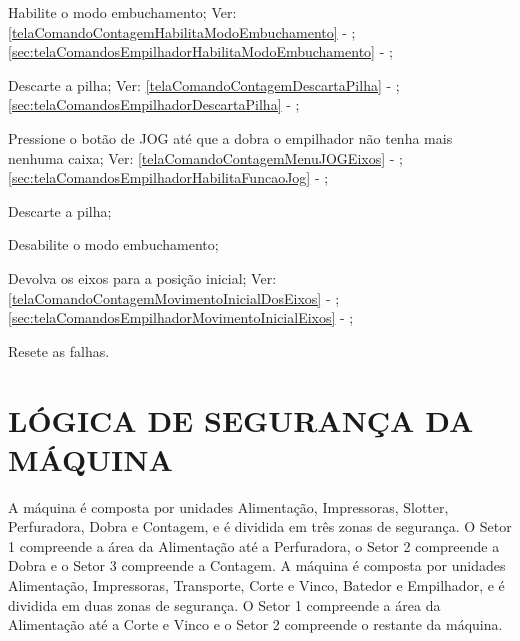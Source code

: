 \begin{procedureFixingIsuesSector3}

  \item[\ding{\dingNumber}] Habilite o modo embuchamento; Ver:
  \ifmachineTypeFlexo
  \ref{telaComandoContagemHabilitaModoEmbuchamento} - ;
  \fi
  \ifmachineTypeIcv
  \ref{sec:telaComandosEmpilhadorHabilitaModoEmbuchamento} - ;
  \fi
  \item[\ding{\dingNumber}] Descarte a pilha; Ver:
  \ifmachineTypeFlexo
  \ref{telaComandoContagemDescartaPilha} - ;
  \fi
  \ifmachineTypeIcv
  \ref{sec:telaComandosEmpilhadorDescartaPilha} - ;
  \fi
  \item[\ding{\dingNumber}] Pressione o botão de JOG até que \ifmachineTypeFlexo a dobra \fi \ifmachineTypeIcv o empilhador \fi não tenha mais nenhuma caixa; Ver:
  \ifmachineTypeFlexo
  \ref{telaComandoContagemMenuJOGEixos} - ;
  \fi
  \ifmachineTypeIcv
  \ref{sec:telaComandosEmpilhadorHabilitaFuncaoJog} - ;
  \fi
  \item[\ding{\dingNumber}] Descarte a pilha;
  \item[\ding{\dingNumber}] Desabilite o modo embuchamento;
  \item[\ding{\dingNumber}] Devolva os eixos para a posição inicial; Ver:
  \ifmachineTypeFlexo
  \ref{telaComandoContagemMovimentoInicialDosEixos} - ;
  \fi
  \ifmachineTypeIcv
  \ref{sec:telaComandosEmpilhadorMovimentoInicialEixos} - ;
  \fi
  \item[\ding{\dingNumber}] Resete as falhas.
  
\end{procedureFixingIsuesSector3}

\newpage
\thispagestyle{fancy}
\vspace*{40 pt}
  
\section{\large\MakeUppercase{{Lógica de segurança da máquina}}}

\ifmachineTypeFlexo
 A máquina é composta por unidades Alimentação, Impressoras, Slotter, Perfuradora, Dobra e Contagem, e é dividida em três zonas de segurança.
 O Setor 1 compreende a área da Alimentação até a Perfuradora, o Setor 2 compreende a Dobra e o Setor 3 compreende a Contagem.
\fi
\ifmachineTypeIcv
A máquina é composta por unidades Alimentação, Impressoras, Transporte, Corte e Vinco, Batedor e Empilhador, e é dividida em duas zonas de segurança.
 O Setor 1 compreende a área da Alimentação até a Corte e Vinco e o Setor 2 compreende o restante da máquina.
\fi

